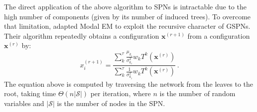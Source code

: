 \documentclass[accepted]{tpm2023} %
\DeclareMathOperator*{\ch}{ch}
\begin{document}
The direct application of the above algorithm to SPNs is intractable due to the high number of components (given by its number of induced trees).
To overcome that limitation, \citet{Madeira2022} adapted Modal EM to exploit the recursive character of GSPNs.
Their algorithm repeatedly obtains a configuration $\mathbf{x}^{(r+1)}$ from a configuration $\mathbf{x}^{(r)}$ by:
\begin{equation}
  \label{eq:memspns}
  x^{(r+1)}_i = \frac{\sum_k^\tau \frac{\mu_{k_i}}{\sigma_{k_i}^2} w_k T^k\left(\mathbf{x}^{(r)}\right)}{\sum_k^\tau \frac{1}{\sigma_{k_i}^2} w_k T^k\left(\mathbf{x}^{(r)}\right)} \, .
\end{equation}
The equation above is computed by traversing the network from the leaves to the root, taking time $\Theta(n|\mathcal{S}|)$ per iteration, where $n$ is the number of random variables and $|\mathcal{S}|$ is the number of nodes in the SPN.



\end{document}
